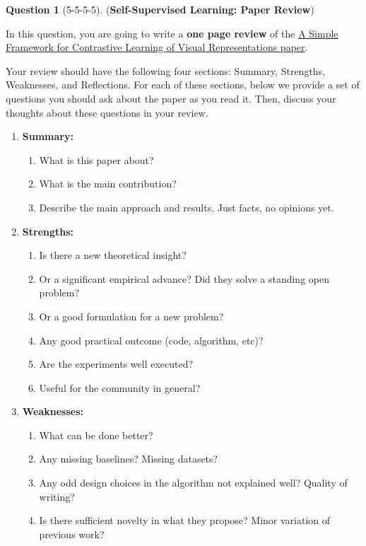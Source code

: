 \documentclass[12pt]{article}
\theoremstyle{definition}
\newtheorem{exercise}{Question}%
\begin{document}
\begin{exercise}[5-5-5-5] (\textbf{Self-Supervised Learning: Paper Review})


In this question, you are going to write a \textbf{one page review} of the \href{https://arxiv.org/pdf/2002.05709.pdf}{A Simple Framework for Contrastive Learning of Visual Representations paper}. 

Your review should have the following four sections: Summary, Strengths, Weaknesses, and Reflections. For each of these sections, below we provide a set of questions you should ask about the paper as you read it. Then, discuss your thoughts about these questions in your review.
\begin{enumerate}[label=(\theexercise.\arabic*)]
    \item \textbf{Summary:}
    \begin{enumerate}
        \item What is this paper about?
        \item What is the main contribution? 
        \item Describe the main approach and results. Just facts, no opinions yet. 
    \end{enumerate}
    \item \textbf{Strengths:}
    \begin{enumerate}
        \item Is there a new theoretical insight?
        \item Or a significant empirical advance? Did they solve a standing open problem? 
        \item Or a good formulation for a new problem? 
        \item Any good practical outcome (code, algorithm, etc)?
        \item Are the experiments well executed? 
        \item Useful for the community in general? 
    \end{enumerate}
    \item \textbf{Weaknesses:}
    \begin{enumerate}
        \item What can be done better?
        \item Any missing baselines? Missing datasets?
        \item Any odd design choices in the algorithm not explained well? Quality of writing?
        \item Is there sufficient novelty in what they propose? Minor variation of previous work? 

\end{enumerate}
\end{enumerate}
\end{exercise}
\end{document}
